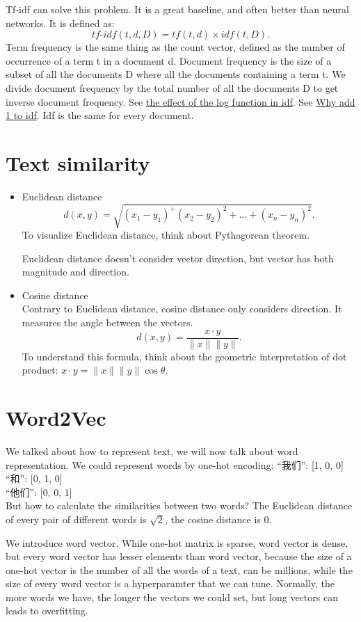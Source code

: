 \documentclass{report}
\begin{document}
Tf-idf can solve this problem. It is a great baseline, and often better than neural networks. It is defined as: \[
	tf\text{-}idf(t, d, D) = tf(t, d) \times idf(t, D)
.\] 
Term frequency is the same thing as the count vector, defined as the number of occurrence of a term t in a document d. Document frequency is the size of a subset of all the documents D where all the documents containing a term t. We divide document frequency by the total number of all the documents D to get inverse document frequency. 
See \href{https://stackoverflow.com/q/27067992/9851286}{the effect of the log function in idf}. See \href{https://stats.stackexchange.com/q/166812/354019}{Why add 1 to idf}.
Idf is the same for every document.

\section{Text similarity}
\begin{itemize}
	\item Euclidean distance
		\[
		d(x, y) = \sqrt{(x_1 - y_1)^ + (x_2 - y_2)^2 + \ldots + (x_n - y_n)^2 } 
		.\] 
	To visualize Euclidean distance, think about Pythagorean theorem. 

	Euclidean distance doesn't consider vector direction, but vector has both magnitude and direction.
	\item Cosine distance\\
	Contrary to Euclidean distance, cosine distance only considers direction. It measures the angle between the vectors. \[
	d(x, y) = \frac{x \cdot y}{\|x\|\|y\|}
	.\] 
	To understand this formula, think about the geometric interpretation of dot product: $x \cdot y = \|x\|\|y\|\cos\theta$.
\end{itemize}

\section{Word2Vec}
We talked about how to represent text, we will now talk about word representation. We could represent words by one-hot encoding:
{\center
“我们”: [1, 0, 0]\\
“和”: [0, 1, 0]\\
“他们”: [0, 0, 1]\\}
But how to calculate the similarities between two words? The Euclidean distance of every pair of different words is $\sqrt{2} $, the cosine distance is $0$. 

We introduce word vector. While one-hot matrix is sparse, word vector is dense, but every word vector has lesser elements than word vector, because the size of a one-hot vector is the number of all the words of a text, can be millions, while the size of every word vector is a hyperparamter that we can tune. Normally, the more words we have, the longer the vectors we could set, but long vectors can leads to overfitting.
\end{document}
